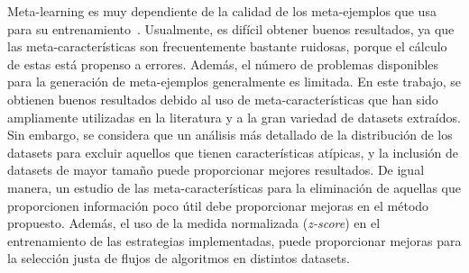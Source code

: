 Meta-learning es muy dependiente de la calidad de los meta-ejemplos que usa para su entrenamiento~\cite{gomes2012combining}. Usualmente, es difícil obtener buenos resultados, ya que las meta-características son frecuentemente bastante ruidosas, porque el cálculo de estas está propenso a errores. Además, el número de problemas disponibles para la generación de meta-ejemplos generalmente es limitada. En este trabajo, se obtienen buenos resultados debido al uso de meta-características que han sido ampliamente utilizadas en la literatura y a la gran variedad de datasets extraídos. Sin embargo, se considera que un análisis más detallado de la distribución de los datasets para excluir aquellos que tienen características atípicas, y la inclusión de datasets de mayor tamaño puede proporcionar mejores resultados. De igual manera, un estudio de las meta-características para la eliminación de aquellas que proporcionen información poco útil debe proporcionar mejoras en el método propuesto. Además, el uso de la medida normalizada (\textit{z-score}) en el entrenamiento de las estrategias implementadas, puede proporcionar mejoras para la selección justa de flujos de algoritmos en distintos datasets.





